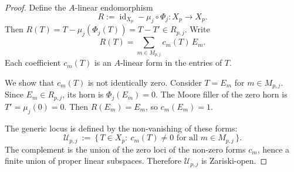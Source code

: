 \begin{proof}
Define the $A$-linear endomorphism
\[
R := \operatorname{id}_{X_p} - \mu_j\circ\Phi_j : X_p\to X_p.
\]
Then $R(T)=T-\mu_j(\Phi_j(T))=T-T' \in R_{p,j}$. Write
\[
R(T) = \sum_{m\in M_{p,j}} c_m(T)\,E_m.
\]
Each coefficient $c_m(T)$ is an $A$-linear form in the entries of $T$.



We show that $c_m(T)$ is not identically zero. Consider $T=E_m$ for $m\in M_{p,j}$. Since $E_m \in R_{p,j}$, its horn is $\Phi_j(E_m)=0$. The Moore filler of the zero horn is $T'=\mu_j(0)=0$.
Then $R(E_m) = E_m$, so $c_m(E_m)=1$.

The generic locus is defined by the non-vanishing of these forms:
\[
\mathcal{U}_{p,j}\ :=\ \{\,T\in X_p:\ c_m(T)\neq 0\text{ for all }m\in M_{p,j}\,\}.
\]
The complement is the union of the zero loci of the non-zero forms $c_m$, hence a finite union of proper linear subspaces. Therefore $\mathcal{U}_{p,j}$ is Zariski-open. 
\end{proof} 
